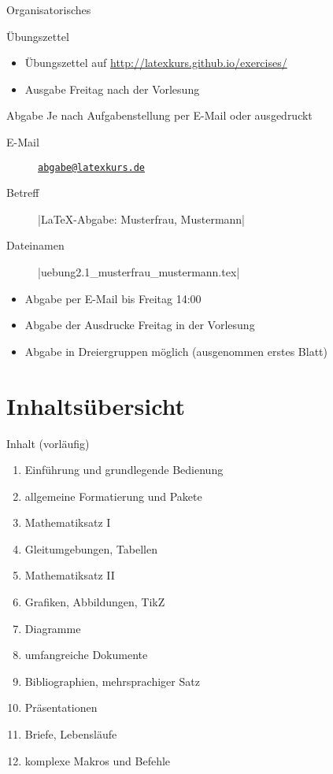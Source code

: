 \documentclass[
	vorläufig=true,
	datum=2016-10-21,
	titel={Einführung und grundlegende Bedienung},
	web=true,
]{../tex/latexkurs-slides}
\begin{document}
\begin{frame}[fragile, t]{Organisatorisches}%
	\begin{block}{Übungszettel}
		\begin{itemize}
			\item Übungszettel auf \url{http://latexkurs.github.io/exercises/}
			\item Ausgabe Freitag nach der Vorlesung
		\end{itemize}
	\end{block}
	\begin{block}{Abgabe}
	Je nach Aufgabenstellung per E-Mail oder ausgedruckt
		\begin{description}
			\item[E-Mail] \href{mailto:abgabe@latexkurs.de}{\texttt{abgabe@latexkurs.de}}\\
			\item[Betreff] |LaTeX-Abgabe: Musterfrau, Mustermann|\\
			\item[Dateinamen] |uebung2.1_musterfrau_mustermann.tex|
		\end{description}
		\vspace{-1ex}
		\begin{itemize}
			\item Abgabe per E-Mail bis Freitag 14:00
			\item Abgabe der Ausdrucke Freitag in der Vorlesung
			\item Abgabe in Dreiergruppen möglich (ausgenommen erstes Blatt)
		\end{itemize}
	\end{block}
\end{frame}





\section{Inhaltsübersicht}

\begin{frame}{Inhalt (vorläufig)}
	\begin{enumerate}
		\item Einführung und grundlegende Bedienung
		\item allgemeine Formatierung und Pakete
		\item Mathematiksatz I
		\item Gleitumgebungen, Tabellen
		\item Mathematiksatz II
		\item Grafiken, Abbildungen, TikZ
		\item Diagramme
		\item umfangreiche Dokumente
		\item Bibliographien, mehrsprachiger Satz
		\item Präsentationen
		\item Briefe, Lebensläufe
		\item komplexe Makros und Befehle
	\end{enumerate}
\end{frame}
\end{document}
